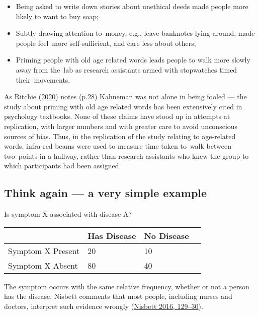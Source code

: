 \documentclass[
  10ptls,
  b5paper]{book}
\providecommand{\tightlist}{%
  \setlength{\itemsep}{0pt}\setlength{\parskip}{0pt}}
\begin{document}
\begin{itemize}
\tightlist
\item
  Being asked to write down stories about unethical deeds made people more likely to want to buy soap;
\item
  Subtly drawing attention to~money, e.g., leave banknotes lying around, made people feel~more self-sufficient, and care less about others;
\item
  Priming people with old age related words leads people to walk more slowly away from the~lab as research assistants armed with stopwatches timed their~movements.
\end{itemize}

As Ritchie (\protect\hyperlink{ref-ritchie2020science}{2020}) notes (p.28) Kahneman was not alone in being fooled --- the study about priming with old age related words has been extensively cited in psychology textbooks. None of these claims have stood up in attempts at replication, with larger numbers and with greater care to avoid unconscious sources of bias. Thus, in the replication of the study relating to age-related words, infra-red beams were used to measure time taken to~walk between two~points in a hallway, rather than research assistants who knew the group to which participants had been assigned.

\hypertarget{think-again-a-very-simple-example}{%
\subsection*{Think again --- a very simple example}\label{think-again-a-very-simple-example}}

Is symptom X associated with disease A?

\begin{longtable}[]{@{}llll@{}}
\toprule\noalign{}
& Has Disease & No Disease & \\
\midrule\noalign{}
\endhead
\bottomrule\noalign{}
\endlastfoot
Symptom X Present & 20 & 10 & \\
Symptom X Absent & 80 & 40 & \\
\end{longtable}

The symptom occurs with the same relative frequency, whether or not a person has the disease. Nisbett comments that most people, including nurses and doctors, interpret such evidence wrongly (\protect\hyperlink{ref-nisbett}{Nisbett 2016, 129--30}).
\end{document}
